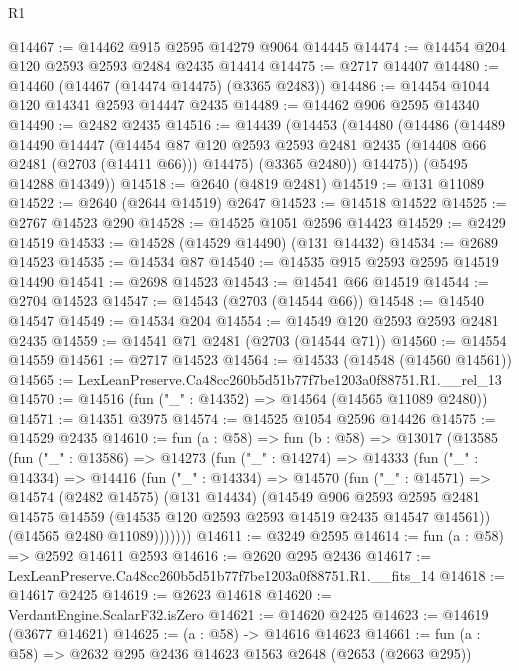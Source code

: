 \begin{lexlean}{R1}
\begin{coremodule}
@14467 := @14462 @915 @2595 @14279 @9064 @14445
@14474 := @14454 @204 @120 @2593 @2593 @2484 @2435 @14414
@14475 := @2717 @14407
@14480 := @14460 (@14467 (@14474 @14475) (@3365 @2483))
@14486 := @14454 @1044 @120 @14341 @2593 @14447 @2435
@14489 := @14462 @906 @2595 @14340
@14490 := @2482 @2435
@14516 := @14439
    (@14453
      (@14480
        (@14486
          (@14489
            @14490
            @14447
            (@14454 @87 @120 @2593 @2593 @2481 @2435 (@14408 @66 @2481 (@2703 (@14411 @66))) @14475)
            (@3365 @2480))
          @14475))
      (@5495 @14288 @14349))
@14518 := @2640 (@4819 @2481)
@14519 := @131 @11089
@14522 := @2640 (@2644 @14519) @2647
@14523 := @14518 @14522
@14525 := @2767 @14523 @290
@14528 := @14525 @1051 @2596 @14423
@14529 := @2429 @14519
@14533 := @14528 (@14529 @14490) (@131 @14432)
@14534 := @2689 @14523
@14535 := @14534 @87
@14540 := @14535 @915 @2593 @2595 @14519 @14490
@14541 := @2698 @14523
@14543 := @14541 @66 @14519
@14544 := @2704 @14523
@14547 := @14543 (@2703 (@14544 @66))
@14548 := @14540 @14547
@14549 := @14534 @204
@14554 := @14549 @120 @2593 @2593 @2481 @2435
@14559 := @14541 @71 @2481 (@2703 (@14544 @71))
@14560 := @14554 @14559
@14561 := @2717 @14523
@14564 := @14533 (@14548 (@14560 @14561))
@14565 := LexLeanPreserve.Ca48cc260b5d51b77f7be1203a0f88751.R1.__rel_13
@14570 := @14516 (fun ("_" : @14352) => @14564 (@14565 @11089 @2480))
@14571 := @14351 @3975
@14574 := @14525 @1054 @2596 @14426
@14575 := @14529 @2435
@14610 := fun (a : @58) =>
  fun (b : @58) =>
  @13017
    (@13585
      (fun ("_" : @13586) =>
      @14273
        (fun ("_" : @14274) =>
        @14333
          (fun ("_" : @14334) =>
          @14416
            (fun ("_" : @14334) =>
            @14570
              (fun ("_" : @14571) =>
              @14574
                (@2482 @14575)
                (@131 @14434)
                (@14549
                  @906
                  @2593
                  @2595
                  @2481
                  @14575
                  @14559
                  (@14535 @120 @2593 @2593 @14519 @2435 @14547 @14561))
                (@14565 @2480 @11089)))))))
@14611 := @3249 @2595
@14614 := fun (a : @58) => @2592 @14611 @2593
@14616 := @2620 @295 @2436
@14617 := LexLeanPreserve.Ca48cc260b5d51b77f7be1203a0f88751.R1.__fits_14
@14618 := @14617 @2425
@14619 := @2623 @14618
@14620 := VerdantEngine.ScalarF32.isZero
@14621 := @14620 @2425
@14623 := @14619 (@3677 @14621)
@14625 := (a : @58) -> @14616 @14623
@14661 := fun (a : @58) =>
  @2632
    @295
    @2436
    @14623
    @1563
    @2648
    (@2653 (@2663 @295))

\end{coremodule}
\end{lexlean}
